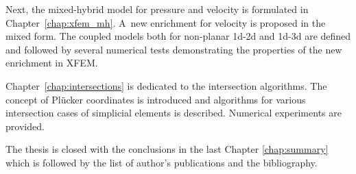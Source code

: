 Next, the mixed-hybrid model for pressure and velocity is formulated in Chapter~\ref{chap:xfem_mh}.
A~new enrichment for velocity is proposed in the mixed form.
The coupled models both for non-planar 1d-2d and 1d-3d are defined and followed by several
numerical tests demonstrating the properties of the new enrichment in XFEM.

Chapter~\ref{chap:intersections} is dedicated to the intersection algorithms.
The concept of Pl\"ucker coordinates is introduced and algorithms for various intersection cases
of simplicial elements is described. Numerical experiments are provided.

The thesis is closed with the conclusions in the last Chapter \ref{chap:summary}
which is followed by the list of author's publications and the bibliography.













